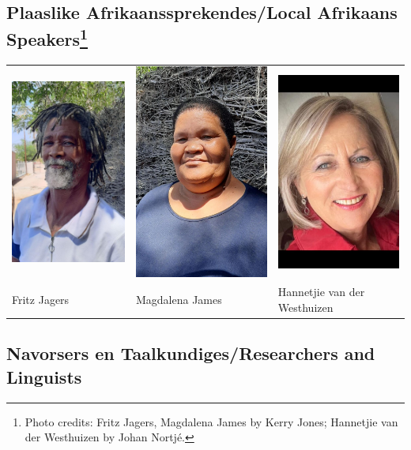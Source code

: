 \markboth{}{}
\subsection*{Plaaslike Afrikaanssprekendes/Local Afrikaans
Speakers\footnote{Photo credits: Fritz Jagers, Magdalena James by
Kerry Jones; Hannetjie van der Westhuizen by Johan Nortj\'{e}.}}
\markboth{}{}

\begin{tabular}{lll}
    \includegraphics[width=.2\textwidth]{fritz_s.jpg} &
    \includegraphics[width=.2\textwidth]{magdalena_s.jpg} &
    \includegraphics[width=.2\textwidth]{hannetjie_s.jpg} \\
    Fritz Jagers & Magdalena James & Hannetjie van der Westhuizen\\
\end{tabular}


\markboth{}{}
\subsection*{Navorsers en Taalkundiges/Researchers and
Linguists\footnotemark}
\markboth{}{}

